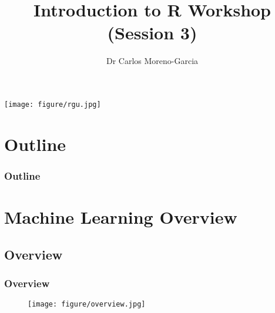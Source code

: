 \documentclass{beamer}\usepackage[]{graphicx}\usepackage[]{color}
\date{}
\begin{document}


\begin{frame}
\title{Introduction to R Workshop \\ (Session 3)}
\author{Dr Carlos Moreno-Garcia}{\texttt{[image: figure/rgu.jpg]}}
\maketitle
\end{frame}



\section{Outline}
\frame{\tableofcontents[pausesections]}\frametitle{Outline}


\section{Machine Learning Overview}
  
\subsection{Overview}

\begin{frame}[fragile] \frametitle{Overview}

\begin{center}
\begin{figure}[hb]
  \centering
  \texttt{[image: figure/overview.jpg]}
\end{figure}
\end{center}

\end{frame}

\end{document}
